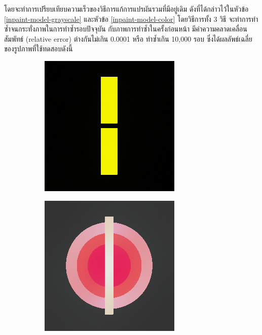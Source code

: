 \documentclass[hidelinks, a4paper,12pt]{article}
\numberwithin{equation}{section}							%
\numberwithin{equation}{section}
\begin{document}
{	\hspace{1cm} โดยจะทำการเปรียบเทียบความเร็วของวิธีการแก้การแปรผันรวมที่มีอยู่เดิม ดังที่ได้กล่าวไว้ในหัวข้อ \ref{inpaint-model-grayscale} และหัวข้อ \ref{inpaint-model-color} โดยวิธีการทั้ง 3 วิธี จะทำการทำซ้ำจนกระทั่งภาพในการทำซ้ำรอบปัจจุบัน กับภาพการทำซ้ำในครั้งก่อนหน้า มีค่าความคลาดเคลื่อนสัมพัทธ์ (relative error) ต่างกันไม่เกิน 0.0001 หรือ ทำซ้ำเกิน 10,000 รอบ ซึ่งได้ผลลัพธ์เฉลี่ยของรูปภาพที่ใช้ทดสอบดังนี้

	\begin{figure}[H]
		\centering
		\begin{subfigure}{0.4\linewidth}
			\centering
			\includegraphics[width=0.8\linewidth]{images/result_ex1/timemarch01.png}
		\end{subfigure}
		\begin{subfigure}{0.4\linewidth}
			\centering
			\includegraphics[width=0.8\linewidth]{images/result_ex1/timemarch02.png}

\end{subfigure}
\end{figure}}
\end{document}

